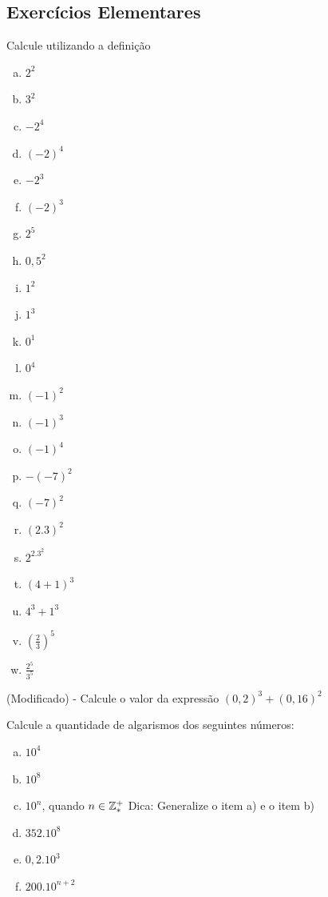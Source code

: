 \subsection{Exercícios Elementares}
\begin{exer}Calcule utilizando a definição
\begin{enumerate}[a)]
	\item $2^2$
	\item $3^2$
	\item $-2^4$
	\item $(-2)^4$
	\item $-2^3$
	\item $(-2)^3$
	\item $2^5$
	\item $0,5^2$
	\item $1^2$
	\item $1^3$
	\item $0^1$
	\item $0^4$
	\item $(-1)^2$
	\item $(-1)^3$
	\item $(-1)^4$
	\item $-(-7)^2$
	\item $(-7)^2$
	\item $(2.3)^2$
	\item $2^2.3^2$
	\item $(4+1)^3$
	\item $4^3 + 1^3$
	\item $\left (\frac{2}{3}\right)^5$
	\item $\frac{2^5}{3^5}$
\end{enumerate}
\end{exer}
\begin{exer}[FUVEST](Modificado) - Calcule o valor da expressão $(0,2)^3+(0,16)^2$
\end{exer}
\begin{exer}Calcule a quantidade de algarismos dos seguintes números:
\begin{enumerate}[a)] 
	\item $10^4$
	\item $10^8$
	\item $10^n$, quando $n \in {\ensuremath{\mathbb{Z}}}^{+}_{*}$ Dica: Generalize o item a) e o item b)
	\item $352.10^8$
	\item $0,2.10^3$
	\item $200.10^{n+2}$
\end{enumerate}
\end{exer}
